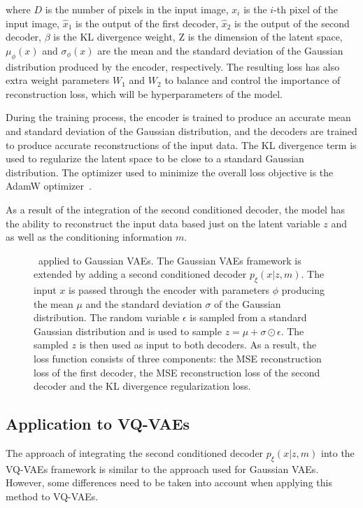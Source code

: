 where $D$ is the number of pixels in the input image, $x_i$ is the $i$-th pixel
of the input image, $\hat{x}_1$ is the output of the first decoder, $\hat{x}_2$
is the output of the second decoder, $\beta$ is the KL divergence weight, Z is
the dimension of the latent space, $\mu_\phi(x)$ and $\sigma_\phi(x)$ are the
mean and the standard deviation of the Gaussian distribution produced by the
encoder, respectively. The resulting loss has also extra weight parameters $W_1$ and $W_2$ to balance and control the importance of reconstruction loss, which will be hyperparameters of the model.

During the training process, the encoder is trained to produce an accurate mean
and standard deviation of the Gaussian distribution, and the decoders are
trained to produce accurate reconstructions of the input data. The KL
divergence term is used to regularize the latent space to be close to a
standard Gaussian distribution. The optimizer used to minimize the overall loss
objective is the AdamW optimizer~\cite{AdamW}.

As a result of the integration of the second conditioned decoder, the model has
the ability to reconstruct the input data based just on the latent variable $z$
and as well as the conditioning information $m$.
\begin{figure}[H]
    \centering
    
    \caption[ applied to Gaussian VAEs.]%
    {
        \methodOne\ applied to Gaussian VAEs. The Gaussian VAEs framework is extended by adding a second conditioned decoder $p_\xi(x|z,m)$. The input $x$ is passed through the encoder with parameters $\phi$ producing the mean $\mu$ and the standard deviation $\sigma$ of the Gaussian distribution. The random variable $\epsilon$ is sampled from a standard Gaussian distribution and is used to sample $ z = \mu + \sigma \odot \epsilon$. The sampled $z$ is then used as input to both decoders. As a result, the loss function consists of three components: the MSE reconstruction loss of the first decoder, the MSE reconstruction loss of the second decoder and the KL divergence regularization loss.
    }\label{SCVAE2DFigure}
\end{figure}

\subsection{Application to VQ-VAEs}

The approach of integrating the second conditioned decoder $p_\xi(x|z,m)$ into
the VQ-VAEs framework is similar to the approach used for Gaussian VAEs.
However, some differences need to be taken into account when applying
this method to VQ-VAEs.


